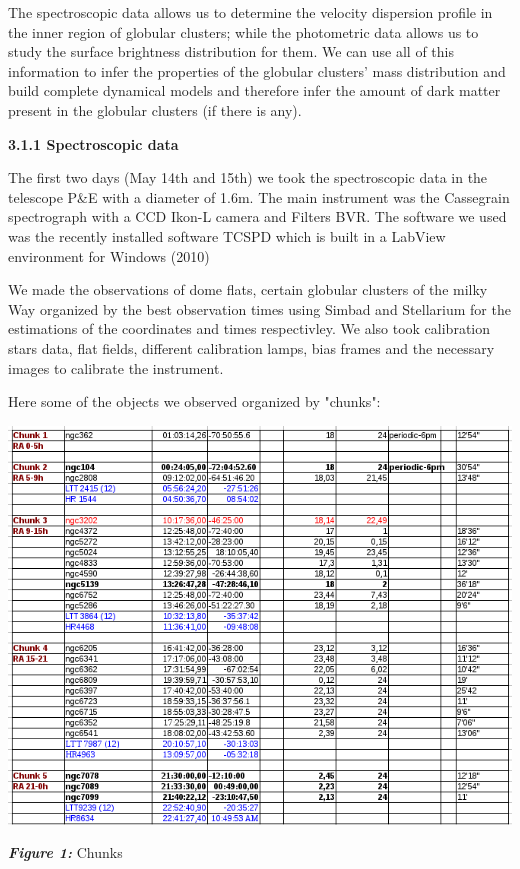 \documentclass[english]{article}
\begin{document}
The spectroscopic data allows us to determine the velocity dispersion profile in the inner region of globular clusters; while the photometric data allows us to study the surface brightness distribution for them. We can use all of this information to infer the properties of the globular clusters' mass distribution and build complete dynamical models and therefore infer the amount of dark matter present in the globular clusters (if there is any).

\textbf{{\large 3.1.1 Spectroscopic data}}

The first two days (May 14th and 15th) we took the spectroscopic data in the telescope P\&E with a diameter of 1.6m. The main instrument was the Cassegrain spectrograph with a CCD Ikon-L camera and Filters BVR. The software we used was the recently installed software TCSPD which is built in a LabView environment for Windows (2010)

We made the observations of dome flats, certain globular clusters of the milky Way organized by the best observation times using Simbad and Stellarium for the estimations of the coordinates and times respectivley. We also took calibration stars data, flat fields, different calibration lamps, bias frames and the necessary images to calibrate the instrument.

Here some of the objects we observed organized by "chunks":

\begin{center}
\includegraphics[scale=0.5]{9.png}

\textit{\textbf{Figure 1:}} Chunks
\end{center}
\end{document}
